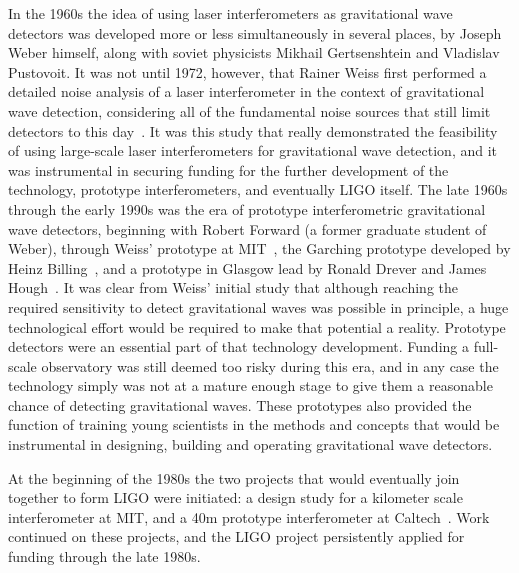 In the 1960s the idea of using laser interferometers as gravitational wave detectors was developed more or less simultaneously 
in several places, by Joseph Weber himself, along with soviet physicists Mikhail Gertsenshtein and Vladislav Pustovoit. 
It was not until 1972, however, that Rainer Weiss first performed a detailed noise analysis of a laser interferometer in the context 
of gravitational wave detection, considering all of the fundamental noise sources that still limit detectors to this day~\cite{Weiss1972}. 
It was this study that really demonstrated the feasibility of using large-scale laser interferometers for gravitational wave detection, and 
it was instrumental in securing funding for the further development of the technology, prototype interferometers, and eventually LIGO itself. 
The late 1960s through the early 1990s was the era of prototype interferometric gravitational wave detectors, beginning with 
Robert Forward (a former graduate student of Weber), through Weiss' prototype at MIT~\cite{MITprototype}, the Garching prototype developed by 
Heinz Billing~\cite{Shoemaker1988}, and a prototype in Glasgow lead by Ronald Drever and James Hough~\cite{JIF}. 
It was clear from Weiss' initial study that although reaching the required sensitivity to detect gravitational waves 
was possible in principle, a huge technological effort would 
be required to make that potential a reality. 
Prototype detectors were an essential part of that technology development. Funding a full-scale 
observatory was still deemed too risky during this era, and in any case the technology simply was not at a mature enough stage to give them 
a reasonable chance of detecting gravitational waves. These prototypes also provided the function 
of training young scientists in the methods and concepts that would be instrumental in 
designing, building and operating gravitational wave detectors. 

At the beginning of the 1980s the two projects that would eventually join together to form LIGO were initiated: 
a design study for a kilometer scale interferometer at MIT, and a 40m 
prototype interferometer at Caltech~\cite{caltech40m}. Work continued on these projects, and the LIGO project persistently applied for funding through the late 1980s.


